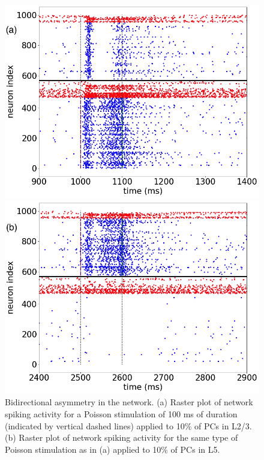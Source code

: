 \begin{figure}[H]
    \begin{minipage}[b]{0.45\textwidth}
    \centering
    \includegraphics[scale=0.23]{Figures/Fig16a.png}
    \end{minipage}
    \hfill
    \begin{minipage}[b]{0.5\textwidth}
    \centering
    \includegraphics[scale=0.23]{Figures/Fig16b.png}
    \end{minipage}
    \caption{Bidirectional asymmetry in the network. (a) Raster plot of network spiking activity for a Poisson stimulation of 100 ms of duration (indicated by vertical dashed lines) applied to 10\% of PCs in L2/3. (b) Raster plot of network spiking activity for the same type of Poisson stimulation as in (a) applied to 10\% of PCs in L5.}
    \label{fig:fig16}
\end{figure}

